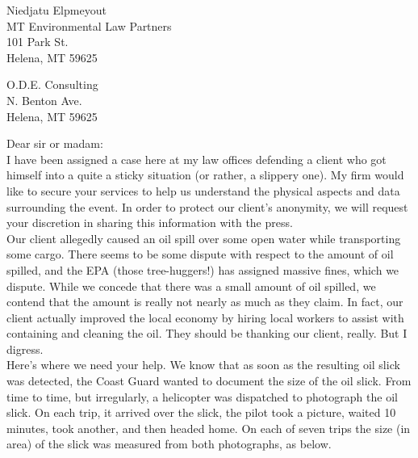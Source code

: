 \begin{lab}
\noindent \hspace*{2.3in} Niedjatu Elpmeyout\\
\hspace*{4in} MT Environmental Law Partners\\
\hspace*{4in} 101 Park St.\\
\hspace*{4in} Helena, MT 59625\\ \vspace{1cm}


\noindent  O.D.E. Consulting\\
 N. Benton Ave.\\
\noindent  Helena, MT 59625\\
\vspace{0.5cm}

\noindent  Dear sir or madam:\\

\noindent  I have been assigned a case here at my law offices defending a client who got himself into a quite a sticky situation (or rather, a slippery one).  My firm would like to secure your services to help us understand the physical aspects and data surrounding the event.  In order to protect our client's anonymity, we will request your discretion in sharing this information with the press.\\

\noindent  Our client allegedly caused an oil spill over some open water while transporting some cargo.  There seems to be some dispute with respect to the amount of oil spilled, and the EPA (those tree-huggers!) has assigned massive fines, which we dispute.  While we concede that there was a small amount of oil spilled, we contend that the amount is really not nearly as much as they claim.  In fact, our client actually improved the local economy by hiring local workers to assist with containing and cleaning the oil.  They should be thanking our client, really.  But I digress.\\

\noindent  Here's where we need your help.  We know that as soon as the resulting oil slick was detected, the Coast Guard wanted to document the size of the oil slick.  From time to time, but irregularly, a helicopter was dispatched to photograph the oil slick. On each trip, it arrived over the slick, the pilot took a picture, waited 10 minutes, took another, and then headed home. On each of seven trips the size (in area) of the slick was measured from both photographs, as below.\\


\end{lab}
